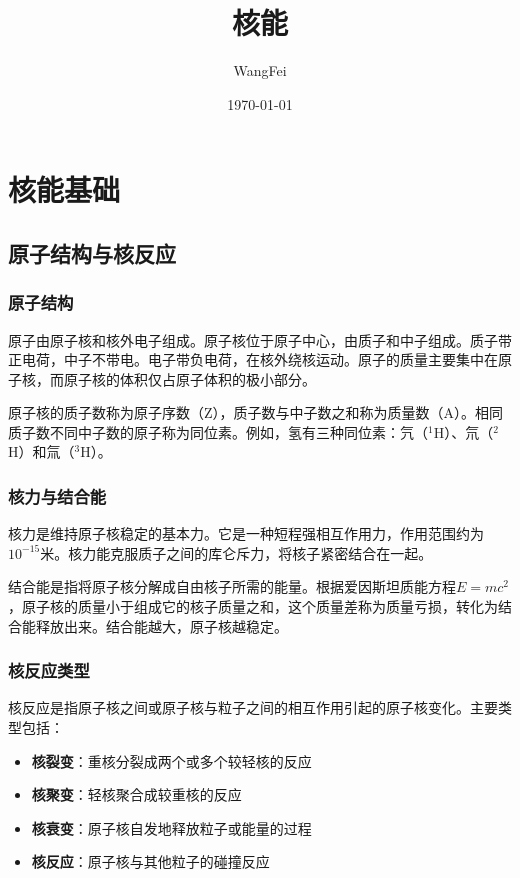 \documentclass[12pt,UTF8]{ctexbook}
\title{\heiti\zihao{0} 核能}
\author{WangFei}
\date{\today}
\begin{document}
\maketitle

\tableofcontents

\part{核能基础}

\chapter{原子结构与核反应}

\section{原子结构}

原子由原子核和核外电子组成。原子核位于原子中心，由质子和中子组成。质子带正电荷，中子不带电。电子带负电荷，在核外绕核运动。原子的质量主要集中在原子核，而原子核的体积仅占原子体积的极小部分。

原子核的质子数称为原子序数（Z），质子数与中子数之和称为质量数（A）。相同质子数不同中子数的原子称为同位素。例如，氢有三种同位素：氕（$^1$H）、氘（$^2$H）和氚（$^3$H）。

\section{核力与结合能}

核力是维持原子核稳定的基本力。它是一种短程强相互作用力，作用范围约为$10^{-15}$米。核力能克服质子之间的库仑斥力，将核子紧密结合在一起。

结合能是指将原子核分解成自由核子所需的能量。根据爱因斯坦质能方程$E=mc^2$，原子核的质量小于组成它的核子质量之和，这个质量差称为质量亏损，转化为结合能释放出来。结合能越大，原子核越稳定。

\section{核反应类型}

核反应是指原子核之间或原子核与粒子之间的相互作用引起的原子核变化。主要类型包括：

\begin{itemize}[leftmargin=2cm]
    \item \textbf{核裂变}：重核分裂成两个或多个较轻核的反应
    \item \textbf{核聚变}：轻核聚合成较重核的反应
    \item \textbf{核衰变}：原子核自发地释放粒子或能量的过程
    \item \textbf{核反应}：原子核与其他粒子的碰撞反应
\end{itemize}
\end{document}
